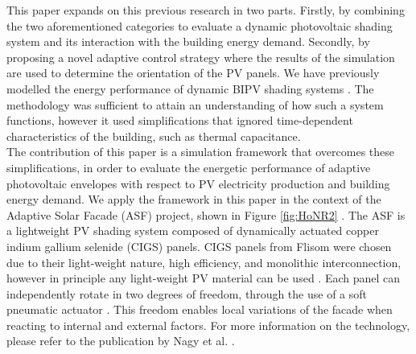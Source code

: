 
This paper expands on this previous research in two parts. Firstly, by combining the two aforementioned categories to evaluate a dynamic photovoltaic shading system and its interaction with the building energy demand. Secondly, by proposing a novel adaptive control strategy where the results of the simulation are used to determine the orientation of the PV panels. We have previously modelled the energy performance of dynamic BIPV shading systems \cite{jayathissa2016PVSEC}. The methodology was sufficient to attain an understanding of how such a system functions, however it used simplifications that ignored time-dependent characteristics of the building, such as thermal capacitance. \\


The contribution of this paper is a simulation framework that overcomes these simplifications, in order to evaluate the energetic performance of adaptive photovoltaic envelopes with respect to PV electricity production and building energy demand. We apply the framework in this paper in the context of the Adaptive Solar Facade (ASF) project, shown in Figure \ref{fig:HoNR2} \cite{nagy2016adaptive}. The ASF is a lightweight PV shading system composed of dynamically actuated copper indium gallium selenide (CIGS) panels. CIGS panels from Flisom were chosen due to their light-weight nature, high efficiency, and monolithic interconnection, however in principle any light-weight PV material can be used \cite{feurer2016progress}. Each panel can independently rotate in two degrees of freedom, through the use of a soft pneumatic actuator \cite{svetozarevic2016soro}. This freedom enables local variations of the facade when reacting to internal and external factors.  For more information on the technology, please refer to the publication by Nagy et al. \cite{nagy2016adaptive}.\\

